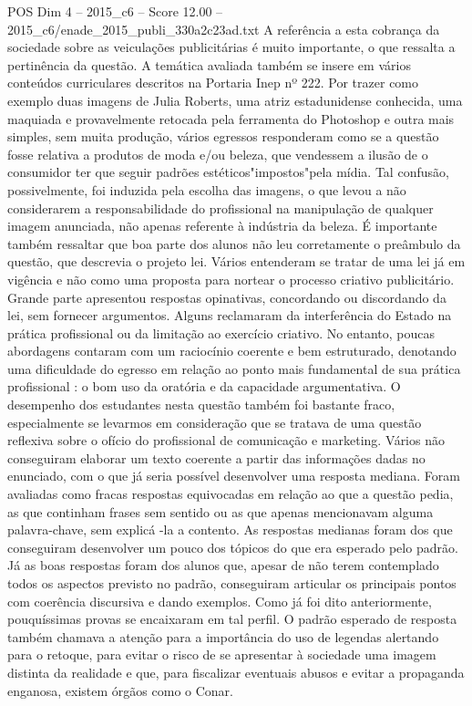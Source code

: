 \begin{textsample}{POS Dim 4 – 2015\_c6 – Score 12.00 – 2015\_c6/enade\_2015\_publi\_330a2c23ad.txt}
A referência a esta cobrança da sociedade sobre as veiculações publicitárias é muito importante, o que ressalta a pertinência da questão.
A temática avaliada também se insere em vários conteúdos curriculares descritos na Portaria Inep nº 222.
Por trazer como exemplo duas imagens de Julia Roberts, uma atriz estadunidense conhecida, uma maquiada e provavelmente retocada pela ferramenta do Photoshop e outra mais simples, sem muita produção, vários egressos responderam como se a questão fosse relativa a produtos de moda e/ou beleza, que vendessem a ilusão de o consumidor ter que seguir padrões estéticos"impostos"pela mídia.
Tal confusão, possivelmente, foi induzida pela escolha das imagens, o que levou a não considerarem a responsabilidade do profissional na manipulação de qualquer imagem anunciada, não apenas referente à indústria da beleza.
É importante também ressaltar que boa parte dos alunos não leu corretamente o preâmbulo da questão, que descrevia o projeto lei.
Vários entenderam se tratar de uma lei já em vigência e não como uma proposta para nortear o processo criativo publicitário.
Grande parte apresentou respostas opinativas, concordando ou discordando da lei, sem fornecer argumentos.
Alguns reclamaram da interferência do Estado na prática profissional ou da limitação ao exercício criativo.
No entanto, poucas abordagens contaram com um raciocínio coerente e bem estruturado, denotando uma dificuldade do egresso em relação ao ponto mais fundamental de sua prática profissional : o bom uso da oratória e da capacidade argumentativa.
O desempenho dos estudantes nesta questão também foi bastante fraco, especialmente se levarmos em consideração que se tratava de uma questão reflexiva sobre o ofício do profissional de comunicação e marketing.
Vários não conseguiram elaborar um texto coerente a partir das informações dadas no enunciado, com o que já seria possível desenvolver uma resposta mediana.
Foram avaliadas como fracas respostas equivocadas em relação ao que a questão pedia, as que continham frases sem sentido ou as que apenas mencionavam alguma palavra-chave, sem explicá -la a contento.
As respostas medianas foram dos que conseguiram desenvolver um pouco dos tópicos do que era esperado pelo padrão.
Já as boas respostas foram dos alunos que, apesar de não terem contemplado todos os aspectos previsto no padrão, conseguiram articular os principais pontos com coerência discursiva e dando exemplos.
Como já foi dito anteriormente, pouquíssimas provas se encaixaram em tal perfil.
O padrão esperado de resposta também chamava a atenção para a importância do uso de legendas alertando para o retoque, para evitar o risco de se apresentar à sociedade uma imagem distinta da realidade e que, para fiscalizar eventuais abusos e evitar a propaganda enganosa, existem órgãos como o Conar.

\end{textsample}
